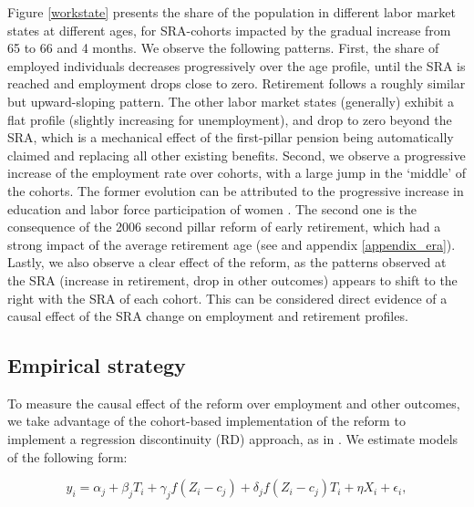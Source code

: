 \documentclass[12pt,a4paper]{article}
\begin{document}
Figure \ref{workstate} presents the share of the population in different labor market states at different ages, for SRA-cohorts impacted by the gradual increase from 65 to 66 and 4 months. We observe the following patterns. First, the share of employed individuals decreases progressively over the age profile, until the SRA is reached and employment drops close to zero. Retirement follows a roughly similar but upward-sloping pattern. The other labor market states (generally) exhibit a flat profile (slightly increasing for unemployment), and drop to zero beyond the SRA, which is a mechanical effect of the first-pillar pension being automatically claimed and replacing all other existing benefits. %
Second, we observe a progressive increase of the employment rate over cohorts, with a large jump in the `middle' of the cohorts. The former evolution can be attributed to the progressive increase in education and labor force participation of women \citep{CPB_2018}. The second one is the consequence of the 2006 second pillar reform of early retirement, which had a strong impact of the average retirement age (see \cite{lindeboom_montizaan_2020} and appendix \ref{appendix_era}). Lastly, we also observe a clear effect of the reform, as the patterns observed at the SRA (increase in retirement, drop in other outcomes) appears to shift to the right with the SRA of each cohort. This can be considered direct evidence of a causal effect of the SRA change on employment and retirement profiles. 

\subsection{Empirical strategy}\label{sec_strategy}

To measure the causal effect of the reform over employment and other outcomes, we take advantage of the cohort-based implementation of the reform to implement a regression discontinuity (RD) approach, as in \cite{geyer_closing_2021}. %
We estimate models of the following form: 

\begin{equation}
	\label{eq_RD_gen}
	y_{i} = \alpha_j  + \beta_{j}  T_{i} + \gamma_{j} f(Z_{i} - c_j)  + \delta_j f(Z_{i} - c_j) T_{i} + \eta X_{i} + \epsilon_{i},
\end{equation}
\end{document}
